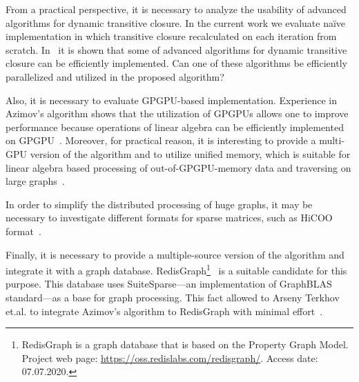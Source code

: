 From a practical perspective, it is necessary to analyze the usability of advanced algorithms for dynamic transitive closure.
In the current work we evaluate na{\"i}ve implementation in which transitive closure recalculated on each iteration from scratch.
In~\cite{cs6345} it is shown that some of advanced algorithms for dynamic transitive closure can be efficiently implemented.
Can one of these algorithms be efficiently parallelized and utilized in the proposed algorithm?

Also, it is necessary to evaluate GPGPU-based implementation.
Experience in Azimov's algorithm shows that the utilization of GPGPUs allows one to improve performance because operations of linear algebra can be efficiently implemented on GPGPU~\cite{Mishin:2019:ECP:3327964.3328503,10.1145/3398682.3399163}. 
Moreover, for practical reason, it is interesting to provide a multi-GPU version of the algorithm and to utilize unified memory, which is suitable for linear algebra based processing of out-of-GPGPU-memory data and traversing on large graphs~\cite{8946118,10.14778/3384345.3384358}.

In order to simplify the distributed processing of huge graphs, it may be necessary to investigate different formats for sparse matrices, such as HiCOO format~\cite{10.5555/3291656.3291682}. 

Finally, it is necessary to provide a multiple-source version of the algorithm and integrate it with a graph database.
RedisGraph\footnote{RedisGraph is a graph database that is based on the Property Graph
Model. Project web page: \url{https://oss.redislabs.com/redisgraph/}. Access date:
07.07.2020.}~\cite{8778293} is a suitable candidate for this purpose.
This database uses SuiteSparse---an implementation of GraphBLAS standard---as a base for graph processing.
This fact allowed to Arseny Terkhov et.al.  to integrate Azimov's algorithm to RedisGraph with minimal effort~\cite{10.1145/3398682.3399163}.
